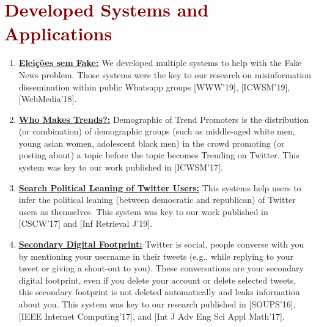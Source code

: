 \section*{\textcolor{maroon}{\normalsize Developed Systems and Applications}} 

\begin{enumerate}

\item \textbf{\href{https://www.eleicoessemfake.dcc.ufmg.br}{Eleições sem Fake:}} We developed multiple systems to help with the Fake News problem. Those systems were the key to our research on misinformation dissemination within public Whatsapp groups [WWW'19], [ICWSM'19], [WebMedia'18].
\item \textbf{\href{https://twitter-app.mpi-sws.org/who-makes-trends/}{Who Makes Trends?:}} Demographic of Trend Promoters is the distribution (or combination) of demographic groups (such as middle-aged white men, young asian women, adolescent black men) in the crowd promoting (or posting about) a topic before the topic becomes Trending on Twitter. This system was key to our work published in [ICWSM'17].
\item \textbf{\href{http://twitter-app.mpi-sws.org/search-political-bias-of-users/}{Search Political Leaning of Twitter Users:}} This systems help users to infer the political leaning (between democratic and republican) of Twitter users as themselves. This system was key to our work published in [CSCW'17] and [Inf Retrieval J'19].
\item \textbf{\href{http://twitter-app.mpi-sws.org/footprint/}{Secondary Digital Footprint:}} Twitter is social, people converse with you by mentioning your username in their tweets (e.g., while replying to your tweet or giving a shout-out to you). These conversations are your secondary digital footprint, even if you delete your account or delete selected tweets, this secondary footprint is not deleted automatically and leaks information about you. This system was key to our research published in [SOUPS'16], [IEEE Internet Computing'17], and [Int J Adv Eng Sci Appl Math'17].

\end{enumerate}

